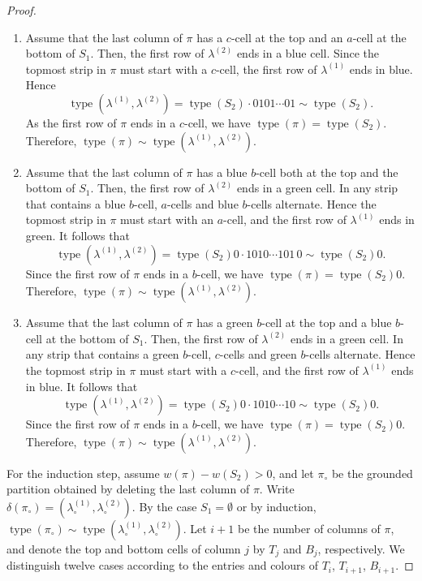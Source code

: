 \documentclass[11pt]{article}
\theoremstyle{definition}
\theoremstyle{remark}
\theoremstyle{definition}
\numberwithin{equation}{section}
\newcommand{\type}{\operatorname{type}}
\begin{document}
\begin{proof}
\begin{enumerate}[label=(1\alph*)]
\item Assume that the last column of \(\pi\) has a \(c\)-cell at the
  top and an \(a\)-cell at the bottom of \(S_1\). Then, the first row
  of \(\lambda^{(2)}\) ends in a blue cell. Since the topmost strip in
  \(\pi\) must start with a \(c\)-cell, the first row of \(\lambda^{(1)}\)
  ends in blue. Hence
  \[
    \type(\lambda^{(1)},\lambda^{(2)})=\type(S_2)\cdot
    0101\cdots01\sim\type(S_2).
  \]
  As the first row of \(\pi\) ends in a \(c\)-cell, we have
  \(\type(\pi)=\type(S_2)\). Therefore,
  \(\type(\pi)\sim\type(\lambda^{(1)},\lambda^{(2)})\).

\item Assume that the last column of \(\pi\) has a blue \(b\)-cell
  both at the top and the bottom of \(S_1\). Then, the first row of
  \(\lambda^{(2)}\) ends in a green cell. In any strip that contains a
  blue \(b\)-cell, \(a\)-cells and blue \(b\)-cells alternate. Hence
  the topmost strip in \(\pi\) must start with an \(a\)-cell, and the
  first row of \(\lambda^{(1)}\) ends in green. It follows that
  \[
    \type(\lambda^{(1)},\lambda^{(2)})=\type(S_2)0\cdot 1010\cdots101\,0\sim\type(S_2)0.
  \]
  Since the first row of \(\pi\) ends in a \(b\)-cell, we have
  \(\type(\pi)=\type(S_2)0\). Therefore,
  \(\type(\pi)\sim\type(\lambda^{(1)},\lambda^{(2)})\).

\item Assume that the last column of \(\pi\) has a green \(b\)-cell at
  the top and a blue \(b\)-cell at the bottom of \(S_1\). Then, the
  first row of \(\lambda^{(2)}\) ends in a green cell. In any strip that
  contains a green \(b\)-cell, \(c\)-cells and green \(b\)-cells
  alternate. Hence the topmost strip in \(\pi\) must start with a
  \(c\)-cell, and the first row of \(\lambda^{(1)}\) ends in blue. It
  follows that
  \[
    \type(\lambda^{(1)},\lambda^{(2)})=\type(S_2)0\cdot 1010\cdots10\sim\type(S_2)0.
  \]
  Since the first row of \(\pi\) ends in a \(b\)-cell, we have
  \(\type(\pi)=\type(S_2)0\). Therefore,
  \(\type(\pi)\sim\type(\lambda^{(1)},\lambda^{(2)})\).
\end{enumerate}

For the induction step, assume \(w(\pi)-w(S_2)>0\), and let \(\pi_\circ\) be the grounded partition obtained by deleting the last column of \(\pi\). Write \(\delta(\pi_\circ)=(\lambda_\circ^{(1)},\lambda_\circ^{(2)})\). By the case \(S_1=\emptyset\) or by induction, \(\type(\pi_\circ)\sim\type(\lambda_\circ^{(1)},\lambda_\circ^{(2)})\). Let \(i+1\) be the number of columns of \(\pi\), and denote the top and bottom cells of column \(j\) by \(T_j\) and \(B_j\), respectively. We distinguish twelve cases according to the entries and colours of \(T_i\), \(T_{i+1}\), \(B_{i+1}\).


\end{proof}
\end{document}
